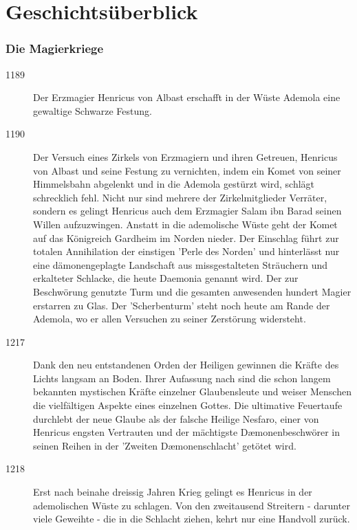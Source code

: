 \documentclass[10pt,twoside,twocolumn,openany]{book}
\begin{document}
\newpage
\section{Geschichtsüberblick}
	
\subsubsection{Die Magierkriege}
\begin{description}
	\item[1189] Der Erzmagier Henricus von Albast erschafft in der Wüste Ademola eine gewaltige Schwarze Festung.
	\item[1190] Der Versuch eines Zirkels von Erzmagiern und ihren Getreuen, Henricus von Albast und seine Festung zu vernichten, indem ein Komet von seiner Himmelsbahn abgelenkt und in die Ademola gestürzt wird, schlägt schrecklich fehl. Nicht nur sind mehrere der Zirkelmitglieder Verräter, sondern es gelingt Henricus auch dem Erzmagier Salam ibn Barad seinen Willen aufzuzwingen. Anstatt in die ademolische Wüste geht der Komet auf das Königreich Gardheim im Norden nieder. Der Einschlag führt zur totalen Annihilation der einstigen 'Perle des Norden' und hinterlässt nur eine dämonengeplagte Landschaft aus missgestalteten Sträuchern und erkalteter Schlacke, die heute Daemonia genannt wird. Der zur Beschwörung genutzte Turm und die gesamten anwesenden hundert Magier erstarren zu Glas. Der 'Scherbenturm' steht noch heute am Rande der Ademola, wo er allen Versuchen zu seiner Zerstörung widersteht.
	\item[1217] Dank den neu entstandenen Orden der Heiligen gewinnen die Kräfte des Lichts langsam an Boden. Ihrer Aufassung nach sind die schon langem bekannten mystischen Kräfte einzelner Glaubensleute und weiser Menschen die vielfältigen Aspekte eines einzelnen Gottes. Die ultimative Feuertaufe durchlebt der neue Glaube als der falsche Heilige Nesfaro, einer von Henricus engsten Vertrauten und der mächtigste D\ae monenbeschwörer in seinen Reihen in der 'Zweiten D\ae monenschlacht' getötet wird.
	\item[1218] Erst nach beinahe dreissig Jahren Krieg gelingt es Henricus in der ademolischen Wüste zu schlagen. Von den zweitausend Streitern - darunter viele Geweihte  - die in die Schlacht ziehen, kehrt nur eine Handvoll zurück.
\end{description}
	
\end{document}

